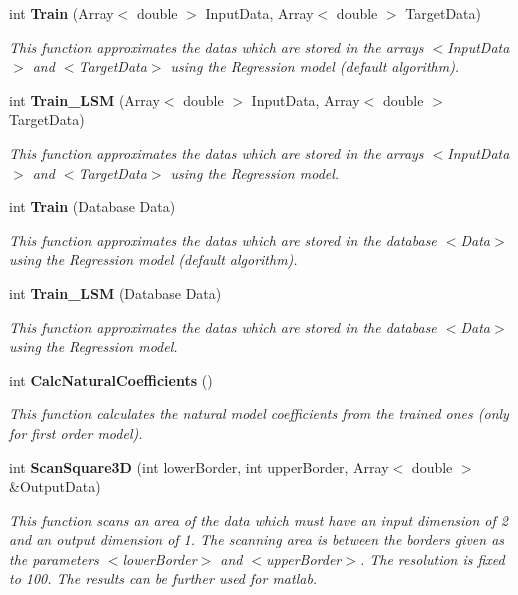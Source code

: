 \begin{CompactItemize}
int {\bf Train} (Array$<$ double $>$ Input\-Data, Array$<$ double $>$ Target\-Data)
\begin{CompactList}\small\item\em This function approximates the datas which are stored in the arrays $<$Input\-Data$>$ and $<$Target\-Data$>$ using the Regression model (default algorithm). \item\end{CompactList}\item 
int {\bf Train\_\-LSM} (Array$<$ double $>$ Input\-Data, Array$<$ double $>$ Target\-Data)
\begin{CompactList}\small\item\em This function approximates the datas which are stored in the arrays $<$Input\-Data$>$ and $<$Target\-Data$>$ using the Regression model. \item\end{CompactList}\item 
int {\bf Train} (Database Data)
\begin{CompactList}\small\item\em This function approximates the datas which are stored in the database $<$Data$>$ using the Regression model (default algorithm). \item\end{CompactList}\item 
int {\bf Train\_\-LSM} (Database Data)
\begin{CompactList}\small\item\em This function approximates the datas which are stored in the database $<$Data$>$ using the Regression model. \item\end{CompactList}\item 
int {\bf Calc\-Natural\-Coefficients} ()
\begin{CompactList}\small\item\em This function calculates the natural model coefficients from the trained ones (only for first order model). \item\end{CompactList}\item 
int {\bf Scan\-Square3D} (int lower\-Border, int upper\-Border, Array$<$ double $>$ \&Output\-Data)
\begin{CompactList}\small\item\em This function scans an area of the data which must have an input dimension of 2 and an output dimension of 1. The scanning area is between the borders given as the parameters $<$lower\-Border$>$ and $<$upper\-Border$>$. The resolution is fixed to 100. The results can be further used for matlab. \item\end{CompactList}\item 

\end{CompactItemize}
